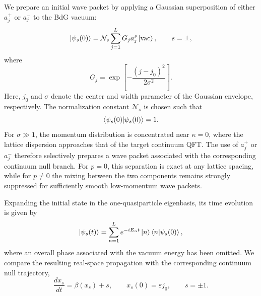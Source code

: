 \documentclass[reprint,amsmath,amssymb,aps,showkeys,superscriptaddress]{revtex4-2}
\begin{document}
We prepare an initial wave packet by applying a Gaussian
superposition of either $a_j^+$ or $a_j^-$ to the BdG vacuum:
\begin{equation}
  \ket{\psi_s(0)}
  =
  \mathcal{N}_s
  \sum_{j=1}^{L}
  G_j a_j^s
  \ket{\mathrm{vac}},
  \qquad
  s=\pm,
  \label{eq:initial_state_a}
\end{equation}
where
\begin{equation}
  G_j
  =
  \exp\left[
    -\frac{(j-j_0)^2}{2\sigma^2}
  \right].
  \label{eq:Gaussian_envelope}
\end{equation}
Here, $j_0$ and $\sigma$ denote the center and width parameter of
the Gaussian envelope, respectively. The normalization constant
$\mathcal{N}_s$ is chosen such that
\begin{equation}
  \braket{\psi_s(0)|\psi_s(0)}=1.
  \label{eq:initial_state_normalization}
\end{equation}
For $\sigma\gg1$, the momentum distribution is concentrated near
$\kappa=0$, where the lattice dispersion approaches that of the
target continuum QFT. The use of $a_j^+$ or $a_j^-$ therefore
selectively prepares a wave packet associated with the corresponding
continuum null branch. For $p=0$, this separation is exact at any
lattice spacing, while for $p\neq0$ the mixing between the two
components remains strongly suppressed for sufficiently smooth
low-momentum wave packets.

Expanding the initial state in the one-quasiparticle eigenbasis, its
time evolution is given by
\begin{equation}
  \ket{\psi_s(t)}
  =
  \sum_{n=1}^{L}
  e^{-iE_nt}
  \ket{n}
  \braket{n|\psi_s(0)},
  \label{eq:time_evolved_state}
\end{equation}
where an overall phase associated with the vacuum energy has been
omitted. We compare the resulting real-space propagation with the
corresponding continuum null trajectory,
\begin{equation}
  \frac{dx_s}{dt}
  =
  \beta(x_s)+s,
  \qquad
  x_s(0)=\varepsilon j_0,
  \qquad
  s=\pm1.
  \label{eq:null_trajectory}
\end{equation}
\end{document}
